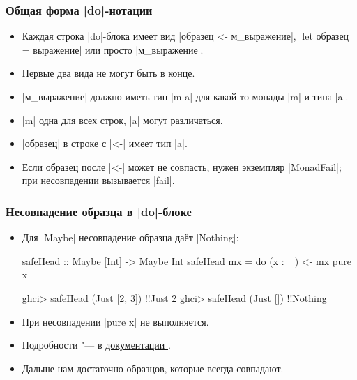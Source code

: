 \documentclass[11pt]{beamer}
\begin{document}
\begin{frame}[fragile]
  \frametitle{Общая форма \haskinline|do|-нотации}
  \begin{itemize}
    \item Каждая строка \haskinline|do|-блока имеет вид \haskinline|образец <- м_выражение|, \haskinline|let образец = выражение| или просто \haskinline|м_выражение|.
    \item Первые два вида не могут быть в конце.
    \item \haskinline|м_выражение| должно иметь тип \haskinline|m a| для какой-то монады \haskinline|m| и типа \haskinline|a|.
    \item \haskinline|m| одна для всех строк, \haskinline|a| могут различаться.
    \item \haskinline|образец| в строке с \haskinline|<-| имеет тип \haskinline|a|.
    \item Если образец после \haskinline|<-| может не совпасть, нужен экземпляр \haskinline|MonadFail|; при несовпадении вызывается \haskinline|fail|.
  \end{itemize}
\end{frame}

\begin{frame}[fragile]
  \frametitle{Несовпадение образца в \haskinline|do|-блоке}
  \begin{itemize}
    \item Для \haskinline|Maybe| несовпадение образца даёт \haskinline|Nothing|:
          \begin{haskell}
            safeHead :: Maybe [Int] -> Maybe Int
            safeHead mx = do
              (x : _) <- mx
              pure x
          \end{haskell}
          \pause
          \begin{haskell}
            ghci> safeHead (Just [2, 3])
            !\pause!Just 2
            ghci> safeHead (Just [])
            !\pause!Nothing
          \end{haskell}
    \item При несовпадении \haskinline|pure x| не выполняется.
    \item Подробности "--- в \href{https://hackage.haskell.org/package/base/docs/Control-Monad-Fail.html#t:MonadFail}{документации }.
    \item Дальше нам достаточно образцов, которые всегда совпадают.
  \end{itemize}
\end{frame}
\end{document}
